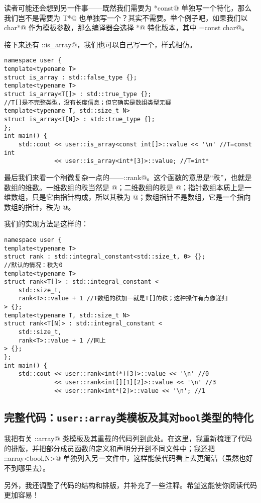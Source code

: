 读者可能还会想到另一件事——既然我们需要为 \lstinline@T*const@ 单独写一个特化，那么我们岂不是需要为 \lstinline@const T*@ 也单独写一个？其实不需要。举个例子吧，如果我们以 \lstinline@const char*@ 作为模板参数，那么编译器会选择 \lstinline@T*@ 特化版本，其中 \lstinline@T=const char@。\par
接下来还有 \lstinline@std::is_array@，我们也可以自己写一个，样式相仿。
\begin{lstlisting}
namespace user {
template<typename T>
struct is_array : std::false_type {};
template<typename T>
struct is_array<T[]> : std::true_type {};
//T[]是不完整类型，没有长度信息；但它确实是数组类型无疑
template<typename T, std::size_t N>
struct is_array<T[N]> : std::true_type {};
};
int main() {
    std::cout << user::is_array<const int[]>::value << '\n' //T=const int
              << user::is_array<int*[3]>::value; //T=int*
\end{lstlisting}\par
最后我们来看一个稍微复杂一点的——\lstinline@std::rank@。这个函数的意思是``秩''，也就是数组的维数。一维数组的秩当然是 @；二维数组的秩是 @；指针数组本质上是一维数组，只是它由指针构成，所以其秩为 @；数组指针不是数组，它是一个指向数组的指针，秩为 @。\par
我们的实现方法是这样的：
\begin{lstlisting}
namespace user {
template<typename T>
struct rank : std::integral_constant<std::size_t, 0> {};
//默认的情况：秩为0
template<typename T>
struct rank<T[]> : std::integral_constant <
    std::size_t,
    rank<T>::value + 1 //T数组的秩加一就是T[]的秩；这种操作有点像递归
> {};
template<typename T, std::size_t N>
struct rank<T[N]> : std::integral_constant <
    std::size_t,
    rank<T>::value + 1 //同上
> {};
};
int main() {
    std::cout << user::rank<int(*)[3]>::value << '\n' //0
              << user::rank<int[][1][2]>::value << '\n' //3
              << user::rank<int*[2]>::value << '\n'; //1
\end{lstlisting}\par
\subsection*{完整代码：\texttt{user::array}类模板及其对\texttt{bool}类型的特化}
我把有关 \lstinline@user::array@ 类模板及其重载的代码列到此处。在这里，我重新梳理了代码的排版，并把部分成员函数的定义和声明分开到不同文件中；我还把 \lstinline@user::array<bool,N>@ 单独列入另一文件中，这样能使代码看上去更简洁（虽然也好不到哪里去）。\par
另外，我还调整了代码的结构和排版，并补充了一些注释。希望这能使你阅读代码更加容易！\par



